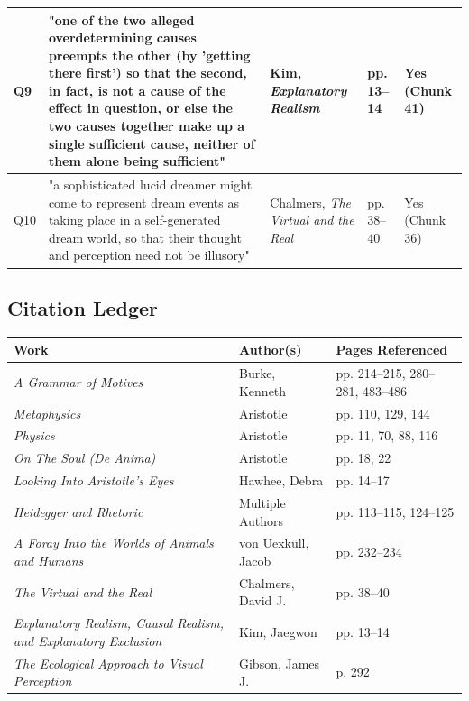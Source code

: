 \begin{center}
\begin{tabular}{|l|l|l|l|l|}
\hline
Q9 & "one of the two alleged overdetermining causes preempts the other (by 'getting there first') so that the second, in fact, is not a cause of the effect in question, or else the two causes together make up a single sufficient cause, neither of them alone being sufficient" & Kim, \textit{Explanatory Realism} & pp. 13--14 & Yes (Chunk 41) \\
\hline
Q10 & "a sophisticated lucid dreamer might come to represent dream events as taking place in a self-generated dream world, so that their thought and perception need not be illusory" & Chalmers, \textit{The Virtual and the Real} & pp. 38--40 & Yes (Chunk 36) \\
\hline
\end{tabular}
\end{center}

\subsection*{Citation Ledger}

\begin{center}
\footnotesize
\begin{tabular}{|l|l|l|}
\hline
\textbf{Work} & \textbf{Author(s)} & \textbf{Pages Referenced} \\
\hline
\textit{A Grammar of Motives} & Burke, Kenneth & pp. 214--215, 280--281, 483--486 \\
\hline
\textit{Metaphysics} & Aristotle & pp. 110, 129, 144 \\
\hline
\textit{Physics} & Aristotle & pp. 11, 70, 88, 116 \\
\hline
\textit{On The Soul (De Anima)} & Aristotle & pp. 18, 22 \\
\hline
\textit{Looking Into Aristotle's Eyes} & Hawhee, Debra & pp. 14--17 \\
\hline
\textit{Heidegger and Rhetoric} & Multiple Authors & pp. 113--115, 124--125 \\
\hline
\textit{A Foray Into the Worlds of Animals and Humans} & von Uexküll, Jacob & pp. 232--234 \\
\hline
\textit{The Virtual and the Real} & Chalmers, David J. & pp. 38--40 \\
\hline
\textit{Explanatory Realism, Causal Realism, and Explanatory Exclusion} & Kim, Jaegwon & pp. 13--14 \\
\hline
\textit{The Ecological Approach to Visual Perception} & Gibson, James J. & p. 292 \\
\hline
\end{tabular}
\end{center}

